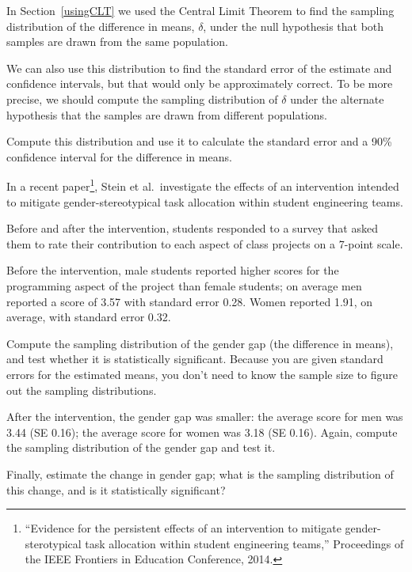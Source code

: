 \documentclass[12pt]{book}
\providecommand\phantomsection{}
\begin{document}
\begin{exercise}
In Section~\ref{usingCLT} we used the Central Limit Theorem to find
the sampling distribution of the difference in means, $\delta$, under
the null hypothesis that both samples are drawn from the same
population.

We can also use this distribution to find the standard error of the
estimate and confidence intervals, but that would only be
approximately correct.  To be more precise, we should compute the
sampling distribution of $\delta$ under the alternate hypothesis that
the samples are drawn from different populations.

Compute this distribution and use it to calculate the standard error
and a 90\% confidence interval for the difference in means.
\end{exercise}


\begin{exercise}
In a recent paper\footnote{``Evidence for the persistent effects of an
  intervention to mitigate gender-sterotypical task allocation within
  student engineering teams,'' Proceedings of the IEEE Frontiers in Education
Conference, 2014.}, Stein et al.~investigate the
effects of an intervention intended to mitigate gender-stereotypical
task allocation within student engineering teams.

Before and after the intervention, students responded to a survey that
asked them to rate their contribution to each aspect of class projects on
a 7-point scale.

Before the intervention, male students reported higher scores for the
programming aspect of the project than female students; on average men
reported a score of 3.57 with standard error 0.28.  Women reported
1.91, on average, with standard error 0.32.

Compute the sampling distribution of the gender gap (the difference in
means), and test whether it is statistically significant.  Because you
are given standard errors for the estimated means, you don't need to
know the sample size to figure out the sampling distributions.
   

After the intervention, the gender gap was smaller: the average score
for men was 3.44 (SE 0.16); the average score for women was 3.18 (SE
0.16).  Again, compute the sampling distribution of the gender gap and
test it.

Finally, estimate the change in gender gap; what is the sampling
distribution of this change, and is it statistically significant?
   
\end{exercise}

\cleardoublepage
\phantomsection
{}%
\printindex

\clearemptydoublepage
\end{document}
